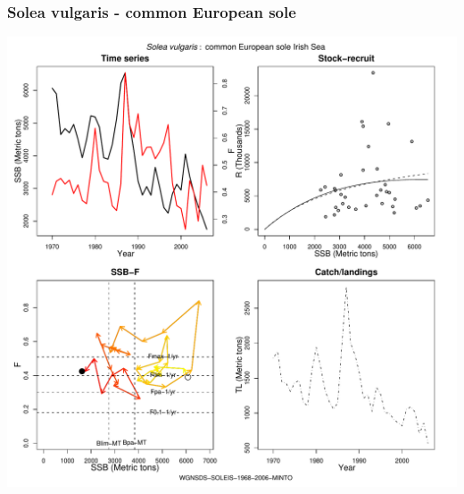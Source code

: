 \subsubsection{Solea vulgaris - common European sole}
\begin{center}
\includegraphics[width=1.2\textwidth]{../R/figures/WGNSDS-SOLEIS-1968-2006-MINTO.pdf}
\end{center}

